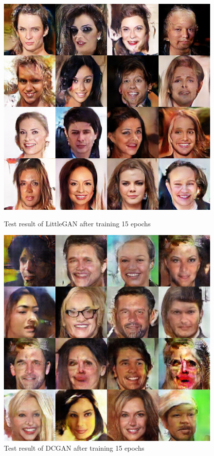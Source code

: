 \begin{figure}
    \begin{minipage}[t]{0.48\linewidth}
        \centering
        \includegraphics[width=\textwidth]{figures/result_littlegan_e15.png}
        \caption{Test result of LittleGAN after training 15 epochs}
        \label{littlegan_e15}
    \end{minipage}
        \hfill
    \begin{minipage}[t]{0.48\linewidth}
        \centering
        \includegraphics[width=\textwidth]{figures/result_dcgan_e15.png}
        \caption{Test result of DCGAN after training 15 epochs}
        \label{dcgan_e15}
    \end{minipage}
\end{figure}


